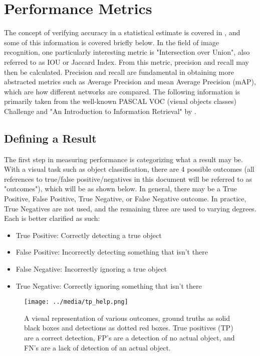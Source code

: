 

\section{Performance Metrics}
\label{appendix_metrics}
The concept of verifying accuracy in a statistical estimate is covered in \cite{manning_introduction_2008}, and some of this information is covered briefly below. In the field of image recognition, one particularly interesting metric is "Intersection over Union", also referred to as IOU or Jaccard Index. From this metric, precision and recall may then be calculated. Precision and recall are fundamental in obtaining more abstracted metrics such as Average Precision and mean Average Precision (mAP), which are how different networks are compared. The following information is primarily taken from the well-known PASCAL VOC (visual objects classes) Challenge \cite{everingham_pascal_2010} and "An Introduction to Information Retrieval" by \cite{manning_introduction_2008}.

\subsection{Defining a Result}
The first step in measuring performance is categorizing what a result may be. With a visual task such as object classification, there are 4 possible outcomes (all references to true/false positive/negatives in this document will be referred to as "outcomes"), which will be  as shown below. In general, there may be a True Positive, False Positive, True Negative, or False Negative outcome. In practice, True Negatives are not used, and the remaining three are used to varying degrees. Each is better clarified as such:
\begin{itemize} \itemsep=-.5em
	\item True Positive: Correctly detecting a true object
	\item False Positive: Incorrectly detecting something that isn't there
	\item False Negative: Incorrectly ignoring a true object
	\item True Negative: Correctly ignoring something that isn't there
\end{itemize}

\begin{figure}[h] %
	\centering
	\texttt{[image: ../media/tp\_help.png]}
	\caption{A visual representation of various outcomes, ground truths as solid black boxes and detections as dotted red boxes. True positives (TP) are a correct detection, FP's are a detection of no actual object, and FN's are a lack of detection of an actual object.}
	\label{tp_help} %
\end{figure}

